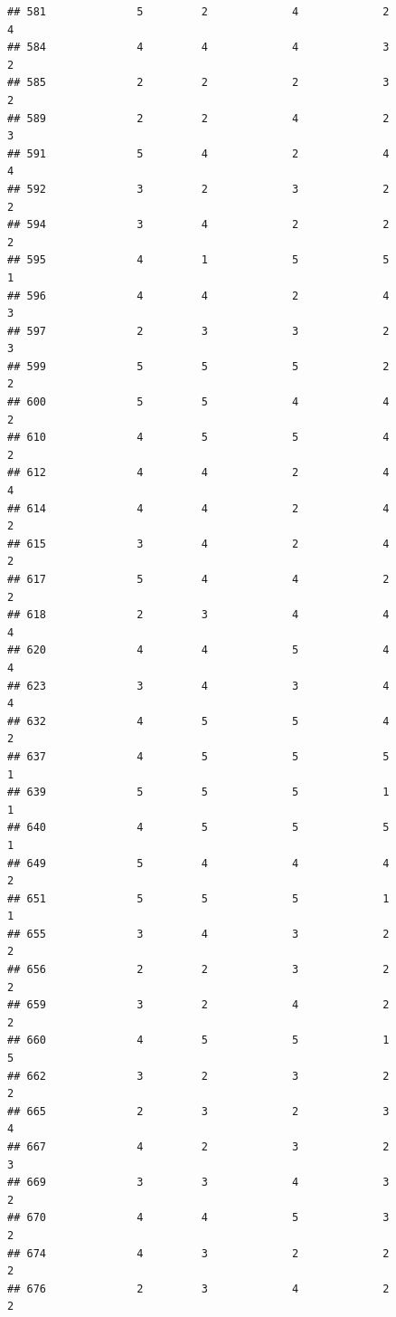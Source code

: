 \documentclass[
]{article}
\begin{document}
\begin{verbatim}
## 581              5         2             4             2           4
## 584              4         4             4             3           2
## 585              2         2             2             3           2
## 589              2         2             4             2           3
## 591              5         4             2             4           4
## 592              3         2             3             2           2
## 594              3         4             2             2           2
## 595              4         1             5             5           1
## 596              4         4             2             4           3
## 597              2         3             3             2           3
## 599              5         5             5             2           2
## 600              5         5             4             4           2
## 610              4         5             5             4           2
## 612              4         4             2             4           4
## 614              4         4             2             4           2
## 615              3         4             2             4           2
## 617              5         4             4             2           2
## 618              2         3             4             4           4
## 620              4         4             5             4           4
## 623              3         4             3             4           4
## 632              4         5             5             4           2
## 637              4         5             5             5           1
## 639              5         5             5             1           1
## 640              4         5             5             5           1
## 649              5         4             4             4           2
## 651              5         5             5             1           1
## 655              3         4             3             2           2
## 656              2         2             3             2           2
## 659              3         2             4             2           2
## 660              4         5             5             1           5
## 662              3         2             3             2           2
## 665              2         3             2             3           4
## 667              4         2             3             2           3
## 669              3         3             4             3           2
## 670              4         4             5             3           2
## 674              4         3             2             2           2
## 676              2         3             4             2           2

\end{verbatim}
\end{document}
